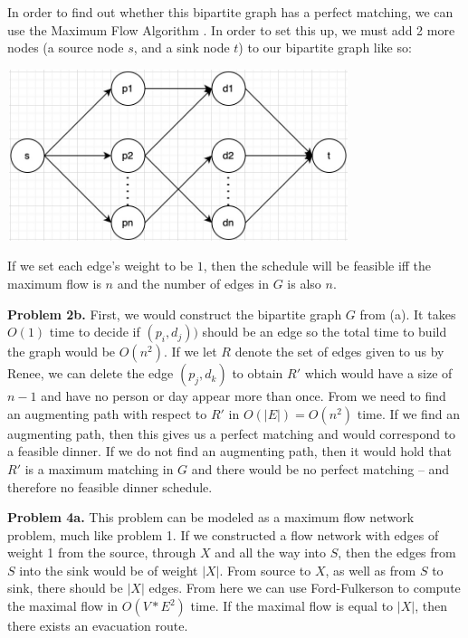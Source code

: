 \documentclass{article}
\begin{document}
In order to find out whether this bipartite graph has a perfect matching, we can use the Maximum Flow Algorithm \cite{website:2}. In order to set this up, we must add 2 more nodes (a source node $s$, and a sink node $t$) to our bipartite graph like so:

\begin{center}
    \includegraphics[width=10cm, height=5cm]{images/maximum-flow-graph.jpg}
\end{center}

If we set each edge's weight to be $1$, then the schedule will be feasible iff the maximum flow is $n$ and the number of edges in $G$ is also $n$.

\hfill

\textbf{Problem 2b.} First, we would construct the bipartite graph $G$ from (a). It takes $O(1)$ time to decide if $(p_i, d_j))$ should be an edge so the total time to build the graph would be $O(n^2)$. If we let $R$ denote the set of edges given to us by Renee, we can delete the edge $(p_j, d_k)$ to obtain $R'$ which would have a size of $n-1$ and have no person or day appear more than once. From \cite{website:3} we need to find an augmenting path with respect to $R'$ in $O(|E|) = O(n^2)$ time. If we find an augmenting path, then this gives us a perfect matching and would correspond to a feasible dinner. If we do not find an augmenting path, then it would hold that $R'$ is a maximum matching in $G$ and there would be no perfect matching -- and therefore no feasible dinner schedule. 

\hfill

\textbf{Problem 4a.} This problem can be modeled as a maximum flow network problem, much like problem 1. If we constructed a flow network with edges of weight 1 from the source, through $X$ and all the way into $S$, then the edges from $S$ into the sink would be of weight $|X|$. From source to $X$, as well as from $S$ to sink, there should be $|X|$ edges. From here we can use Ford-Fulkerson \cite{website:4} to compute the maximal flow in $O(V*E^2)$ time. If the maximal flow is equal to $|X|$, then there exists an evacuation route.
\end{document}

